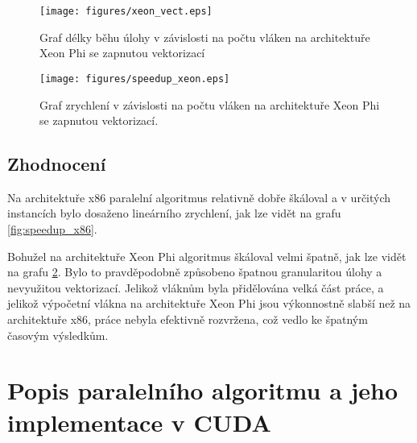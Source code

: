 \documentclass[12pt]{article}
\begin{document}
\begin{figure}[!h]
	\centering
    \texttt{[image: figures/xeon\_vect.eps]}
    \caption{Graf délky běhu úlohy v závislosti na počtu vláken na architektuře Xeon Phi se zapnutou vektorizací}
    \label{fig:xeon_vect}
\end{figure}

\begin{figure}[!h]
	\centering
    \texttt{[image: figures/speedup\_xeon.eps]}
    \caption{Graf zrychlení v závislosti na počtu vláken na architektuře Xeon Phi se zapnutou vektorizací.}
    \label{fig:speedup_xeon}
\end{figure}

\clearpage
\subsection{Zhodnocení}
Na architektuře x86 paralelní algoritmus relativně dobře škáloval a v určitých instancích bylo dosaženo lineárního zrychlení, jak lze vidět na grafu \ref{fig:speedup_x86}. \par
Bohužel na architektuře Xeon Phi algoritmus škáloval velmi špatně, jak lze vidět na grafu \ref{fig:speedup_xeon}. Bylo to pravděpodobně způsobeno špatnou granularitou úlohy a nevyužitou vektorizací. Jelikož vláknům byla přidělována velká část práce, a jelikož výpočetní vlákna na architektuře Xeon Phi jsou výkonnostně slabší než na architektuře x86, práce nebyla efektivně rozvržena, což vedlo ke špatným časovým výsledkům. 

\section{Popis paralelního algoritmu a jeho implementace v CUDA}
\end{document}
